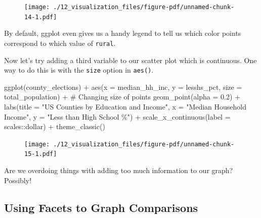 \documentclass[
  letterpaper,
]{book}
\newenvironment{Shaded}{\begin{snugshade}}{\end{snugshade}}
\newcommand{\AttributeTok}[1]{\textcolor[rgb]{0.40,0.45,0.13}{#1}}
\newcommand{\CommentTok}[1]{\textcolor[rgb]{0.37,0.37,0.37}{#1}}
\newcommand{\FloatTok}[1]{\textcolor[rgb]{0.68,0.00,0.00}{#1}}
\newcommand{\FunctionTok}[1]{\textcolor[rgb]{0.28,0.35,0.67}{#1}}
\newcommand{\NormalTok}[1]{\textcolor[rgb]{0.00,0.23,0.31}{#1}}
\newcommand{\SpecialCharTok}[1]{\textcolor[rgb]{0.37,0.37,0.37}{#1}}
\newcommand{\StringTok}[1]{\textcolor[rgb]{0.13,0.47,0.30}{#1}}
\theoremstyle{definition}
\theoremstyle{definition}
\theoremstyle{plain}
\theoremstyle{definition}
\theoremstyle{plain}
\theoremstyle{plain}
\theoremstyle{remark}
\begin{document}
\begin{figure}[H]

{\centering \texttt{[image: ./12\_visualization\_files/figure-pdf/unnamed-chunk-14-1.pdf]}

}

\end{figure}

By default, ggplot even gives us a handy legend to tell us which color
points correspond to which value of \texttt{rural}.

Now let's try adding a third variable to our scatter plot which is
continuous. One way to do this is with the \texttt{size} option in
\texttt{aes()}.

\begin{Shaded}
\begin{Highlighting}[]
\FunctionTok{ggplot}\NormalTok{(county\_elections) }\SpecialCharTok{+}
  \FunctionTok{aes}\NormalTok{(}\AttributeTok{x =}\NormalTok{ median\_hh\_inc, }\AttributeTok{y =}\NormalTok{ lesshs\_pct,}
      \AttributeTok{size =}\NormalTok{ total\_population) }\SpecialCharTok{+} \CommentTok{\# Changing size of points}
  \FunctionTok{geom\_point}\NormalTok{(}\AttributeTok{alpha =} \FloatTok{0.2}\NormalTok{) }\SpecialCharTok{+} 
  \FunctionTok{labs}\NormalTok{(}\AttributeTok{title =} \StringTok{"US Counties by Education and Income"}\NormalTok{,}
       \AttributeTok{x =} \StringTok{"Median Household Income"}\NormalTok{,}
       \AttributeTok{y =} \StringTok{"Less than High School \%"}\NormalTok{) }\SpecialCharTok{+}
  \FunctionTok{scale\_x\_continuous}\NormalTok{(}\AttributeTok{label =}\NormalTok{ scales}\SpecialCharTok{::}\NormalTok{dollar) }\SpecialCharTok{+}
  \FunctionTok{theme\_classic}\NormalTok{()}
\end{Highlighting}
\end{Shaded}

\begin{figure}[H]

{\centering \texttt{[image: ./12\_visualization\_files/figure-pdf/unnamed-chunk-15-1.pdf]}

}

\end{figure}

Are we overdoing things with adding too much information to our graph?
Possibly!

\hypertarget{using-facets-to-graph-comparisons}{%
\subsection{Using Facets to Graph
Comparisons}\label{using-facets-to-graph-comparisons}}
\end{document}
